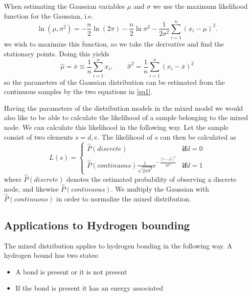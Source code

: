 \documentclass[10pt, journal, compsoc, a4paper]{IEEEtran}
\begin{document}
When estimating the Gaussian variables $\mu$ and $\sigma$ we use the maximum likelihood function for the Gaussian, i.e.
\begin{equation}
  \ln(\mu, \sigma^2) = -\frac{n}{2}\ln(2\pi) - \frac{n}{2}\ln\sigma^2 - \frac{1}{2\sigma^2}\sum_{i=1}^n (x_i-\mu)^2.
\end{equation}
we wish to maximize this function, so we take the derivative and find the stationary points. Doing this yields
\begin{equation}
  \hat{\mu} = \overline{x} \equiv \frac{1}{n}\sum_{i=1}^n x_i, \qquad \hat{\sigma}^2 = \frac{1}{n} \sum_{i=1}^n (x_i - \overline{x})^2
  \label{eq1}
\end{equation}
so the parameters of the Gaussian distribution can be estimated from the continuous samples by the two equations in \ref{eq1}\cite{Bishop}. 


Having the parameters of the distribution models in the mixed model we would also like to be able to calculate the likelihood of a sample belonging to the mixed node. We can calculate this likelihood in the following way. Let the sample consist of two elements $s = {d, e}$. The likelihood of $s$ can then be calculated as
\begin{equation} 
L(s) = 
\left\{
\begin{array}{ll} 
  \hat{P}(discrete) & \mathbf{if } d = 0  \\
  \hat{P}(continuous) \frac{1}{\sqrt{2\pi\hat{\sigma}^2}} e^{ -\frac{(e-\hat{\mu})^2}{2\hat{\sigma}^2} }  & \mathbf{if } d = 1    
  \label{eq6}
\end{array} 
\right. 
\end{equation} 
where $\hat{P}(discrete)$ denotes the estimated probability of observing a discrete node, and likewise $\hat{P}(continuous)$. We multiply the Gaussian with $\hat{P}(continuous)$ in order to normalize the mixed distribution.


\subsection{Applications to Hydrogen bounding} %
\label{sub:applications_to_hydrogen_bounding}
The mixed distribution applies to hydrogen bonding in the following way. A hydrogen bound has two states:

\begin{itemize}
  \item A bond is present or it is not present
  \item If the bond is present it has an energy associated
\end{itemize}
\end{document}
